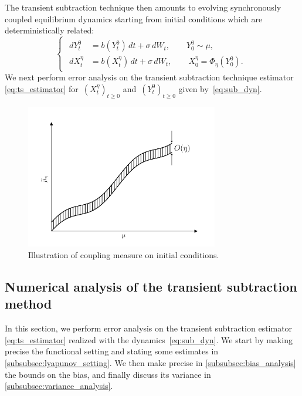 \documentclass[11pt]{article}
\renewcommand{\geq}{\geqslant}
\theoremstyle{definition}
\begin{document}
The transient subtraction technique then amounts to evolving synchronously coupled equilibrium dynamics starting from initial conditions which are deterministically related:
\begin{equation}
\begin{cases}
\begin{aligned}
	dY_t^0 &= b(Y_t^0) \, dt + \sigma \, dW_t, \qquad Y_0^0 \sim \mu, \\
	dX_t^\eta &= b(X_t^\eta) \, dt + \sigma \, dW_t, \qquad X_0^\eta = \Phi_\eta(Y_0^0).
\end{aligned}
\end{cases}
\label{eq:sub_dyn}
\end{equation}
We next perform error analysis on the transient subtraction technique estimator \eqref{eq:ts_estimator} for~$(X_t^\eta)_{t\geq 0}$ and~$(Y_t^0)_{t\geq 0}$ given by~\eqref{eq:sub_dyn}.
 
\begin{figure}\centering
	\includegraphics[width=0.75\textwidth]{coup_meas_plot.pdf}
	\caption{Illustration of coupling measure on initial conditions.}
	\label{fig:coup_meas_mock}
\end{figure}

\subsection{Numerical analysis of the transient subtraction method}
\label{subsec:num_anal_ts}
In this section, we perform error analysis on the transient subtraction estimator \eqref{eq:ts_estimator} realized with the dynamics~\eqref{eq:sub_dyn}. We start by making precise the functional setting and stating some estimates in \cref{subsubsec:lyapunov_setting}. We then make precise in \cref{subsubsec:bias_analysis} the bounds on the bias, and finally discuss its variance in \cref{subsubsec:variance_analysis}.
\end{document}
